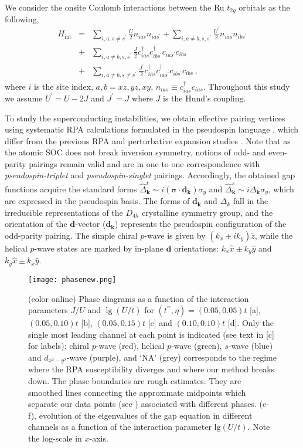\documentclass[aps,prl,twocolumn,superscriptaddress,showpacs]{revtex4-1}
\newcommand{\bs}{\boldsymbol}
\begin{document}
We consider the onsite Coulomb interactions between the Ru $t_{2g}$ orbitals as the following,
\begin{eqnarray}
H_\text{int}&=& \sum_{i,a,s\neq s^\prime}\frac{U}{2} n_{ias} n_{ias^\prime} + \sum_{i,a\neq b,s,s^\prime} \frac{U^\prime}{2}n_{ias}n_{ibs^\prime} \nonumber \\
&+& \sum_{i,a\neq b,s,s^\prime} \frac{J}{2} c^\dagger_{ias}c^\dagger_{ibs^\prime}c_{ias^\prime}c_{ibs} \nonumber \\
&+& \sum_{i,a\neq b,s\neq s^\prime} \frac{J^\prime}{2}c^\dagger_{ias}c^\dagger_{ias^\prime}c_{ibs^\prime}c_{ibs} \,,
\label{eq:interactions}
\end{eqnarray}
where $i$ is the site index, $a,b=xz,yz,xy$, $n_{ias} \equiv c^\dagger_{ias}c_{ias}$. Throughout this study we assume $U^\prime=U-2J$ and $J^\prime=J$ where $J$ is the Hund's coupling.

To study the superconducting instabilities, we obtain effective pairing vertices using systematic RPA calculations formulated in the pseudospin language \cite{seeSupp}, which differ from the previous RPA and perturbative expansion studies \cite{Takimoto:00,Nomura:00,Nomura:02}. Note that as the atomic SOC does not break inversion symmetry, notions of odd- and even-parity pairings remain valid and are in one to one correspondence with {\it pseudospin-triplet} and {\it pseudospin-singlet} pairings. Accordingly, the obtained gap functions acquire the standard forms $\hat{\Delta}^t_{\bs k}\sim i (\bs \sigma \cdot \bs d_{\bs k})\sigma_y$ and $\hat{\Delta}^s_{\bs k}\sim i \Delta_{\bs k} \sigma_y$, which are expressed in the pseudospin basis. The forms of ${\bs d}_{\bs k} $ and $\Delta_k$ fall in the irreducible representations of the $D_{4h}$ crystalline symmetry group, and the orientation of the $\bs d$-vector ($\bs d_{\bs k}$) represents the pseudospin configuration of the odd-parity pairing. The simple chiral $p$-wave is given by $(k_x \pm ik_y) \hat{z}$, while the helical $p$-wave states are marked by in-plane ${\bs d}$ orientations: $k_x \hat{x} \pm k_y \hat{y}$ and $k_y \hat{x} \pm k_x \hat{y}$.

\begin{figure}
\texttt{[image: phasenew.png]} %
\caption{(color online) Phase diagrams as a function of the interaction parameters $J/U$ and $\lg(U/t)$ for $(t^{\prime\prime},\eta)=(0.05,0.05)t$ [a], $(0.05,0.10)t$ [b], $(0.05,0.15)t$ [c] and $(0.10,0.10)t$ [d]. Only the single most leading channel at each point is indicated (see text in [c] for labels): chiral $p$-wave (red), helical $p$-wave (green), $s$-wave (blue) and $d_{x^2-y^2}$-wave (purple), and `NA' (grey) corresponds to the regime where the RPA susceptibility diverges and where our method breaks down. The phase boundaries are rough estimates. They are smoothed lines connecting the approximate midpoints which separate our data points (see ) associated with different phases. (e-f), evolution of the eigenvalues of the gap equation in different channels as a function of the interaction parameter $\text{lg}(U/t)$. Note the log-scale in $x$-axis.}
\label{fig:PhaseDiag}
\end{figure}
\end{document}
